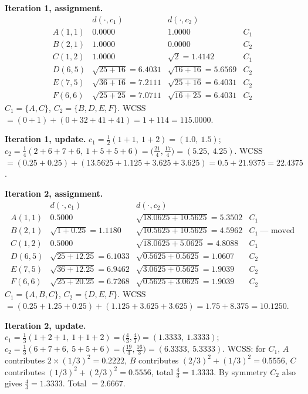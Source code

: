 \documentclass[11pt]{article}
\begin{document}
\textbf{Iteration 1, assignment.}
\[
\begin{array}{lccl}
  & d(\cdot,c_1) & d(\cdot,c_2) & \\[2pt]
  A(1,1) & 0.0000 & 1.0000 & C_1\\
  B(2,1) & 1.0000 & 0.0000 & C_2\\
  C(1,2) & 1.0000 & \sqrt{2}=1.4142 & C_1\\
  D(6,5) & \sqrt{25+16}=6.4031 & \sqrt{16+16}=5.6569 & C_2\\
  E(7,5) & \sqrt{36+16}=7.2111 & \sqrt{25+16}=6.4031 & C_2\\
  F(6,6) & \sqrt{25+25}=7.0711 & \sqrt{16+25}=6.4031 & C_2
\end{array}
\]
$C_1 = \{A,C\}$, $C_2 = \{B,D,E,F\}$.
WCSS $= (0 + 1) + (0 + 32 + 41 + 41) = 1 + 114 = \mathbf{115.0000}$.

\textbf{Iteration 1, update.}
$c_1 = \frac12(1{+}1,\ 1{+}2) = (1.0,\ 1.5)$;
$c_2 = \frac14(2{+}6{+}7{+}6,\ 1{+}5{+}5{+}6) = \bigl(\frac{21}{4},
\frac{17}{4}\bigr) = (5.25,\ 4.25)$.
WCSS $= (0.25 + 0.25) + (13.5625 + 1.125 + 3.625 + 3.625)
= 0.5 + 21.9375 = \mathbf{22.4375}$.

\textbf{Iteration 2, assignment.}
\[
\begin{array}{lccl}
  & d(\cdot,c_1) & d(\cdot,c_2) & \\[2pt]
  A(1,1) & 0.5000 & \sqrt{18.0625+10.5625}=5.3502 & C_1\\
  B(2,1) & \sqrt{1+0.25}=1.1180 & \sqrt{10.5625+10.5625}=4.5962 & C_1\ \text{--- moved}\\
  C(1,2) & 0.5000 & \sqrt{18.0625+5.0625}=4.8088 & C_1\\
  D(6,5) & \sqrt{25+12.25}=6.1033 & \sqrt{0.5625+0.5625}=1.0607 & C_2\\
  E(7,5) & \sqrt{36+12.25}=6.9462 & \sqrt{3.0625+0.5625}=1.9039 & C_2\\
  F(6,6) & \sqrt{25+20.25}=6.7268 & \sqrt{0.5625+3.0625}=1.9039 & C_2
\end{array}
\]
$C_1 = \{A,B,C\}$, $C_2 = \{D,E,F\}$.
WCSS $= (0.25 + 1.25 + 0.25) + (1.125 + 3.625 + 3.625)
= 1.75 + 8.375 = \mathbf{10.1250}$.

\textbf{Iteration 2, update.}
$c_1 = \frac13(1{+}2{+}1,\ 1{+}1{+}2) = \bigl(\frac43, \frac43\bigr)
= (1.3333,\ 1.3333)$;
$c_2 = \frac13(6{+}7{+}6,\ 5{+}5{+}6) = \bigl(\frac{19}{3}, \frac{16}{3}\bigr)
= (6.3333,\ 5.3333)$.
WCSS: for $C_1$, $A$ contributes $2\times(1/3)^2 = 0.2222$, $B$ contributes
$(2/3)^2 + (1/3)^2 = 0.5556$, $C$ contributes $(1/3)^2 + (2/3)^2 = 0.5556$,
total $\frac43 = 1.3333$. By symmetry $C_2$ also gives $\frac43 = 1.3333$.
Total $= \mathbf{2.6667}$.
\end{document}
